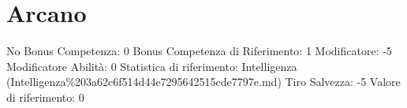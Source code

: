 \section{Arcano}\label{arcano}

\begin{description}
\tightlist
\item[Tags: ABI]
No Bonus Competenza: 0 Bonus Competenza di Riferimento: 1 Modificatore:
-5 Modificatore Abilità: 0 Statistica di riferimento: Intelligenza
(Intelligenza\%203a62c6f514d44e7295642515cde7797e.md) Tiro Salvezza: -5
Valore di riferimento: 0
\end{description}
